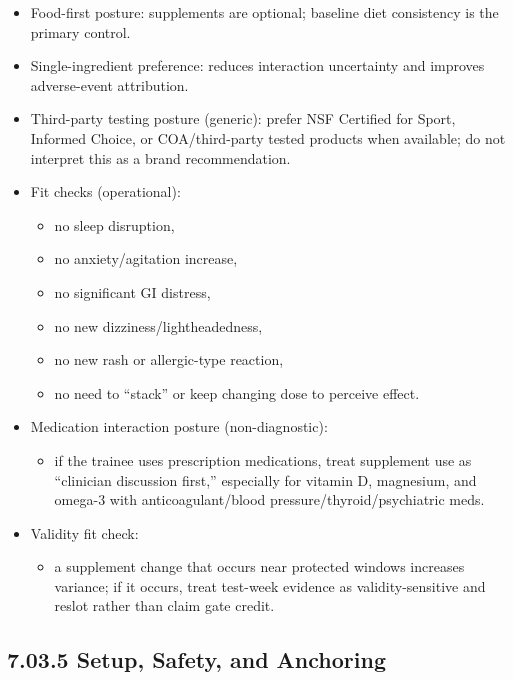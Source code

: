 \documentclass[10pt]{article}
\begin{document}
\begin{itemize}
\item Food-first posture: supplements are optional; baseline diet consistency is the primary control.
\item Single-ingredient preference: reduces interaction uncertainty and improves adverse-event attribution.
\item Third-party testing posture (generic): prefer NSF Certified for Sport, Informed Choice, or COA/third-party tested products when available; do not interpret this as a brand recommendation.
\item Fit checks (operational):
  \begin{itemize}
  \item no sleep disruption,
  \item no anxiety/agitation increase,
  \item no significant GI distress,
  \item no new dizziness/lightheadedness,
  \item no new rash or allergic-type reaction,
  \item no need to “stack” or keep changing dose to perceive effect.
  \end{itemize}
\item Medication interaction posture (non-diagnostic):
  \begin{itemize}
  \item if the trainee uses prescription medications, treat supplement use as “clinician discussion first,” especially for vitamin D, magnesium, and omega-3 with anticoagulant/blood pressure/thyroid/psychiatric meds.
  \end{itemize}
\item Validity fit check:
  \begin{itemize}
  \item a supplement change that occurs near protected windows increases variance; if it occurs, treat test-week evidence as validity-sensitive and reslot rather than claim gate credit.
  \end{itemize}
\end{itemize}

\subsection*{7.03.5 Setup, Safety, and Anchoring}
{}
\end{document}
